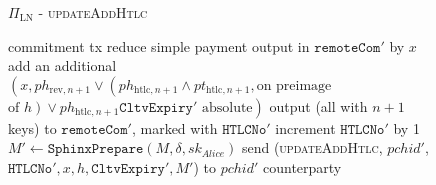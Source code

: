 \begin{figure}[H]
\begin{protocolbox}{$\Pi_{\mathrm{LN}}$ - \textsc{updateAddHtlc}}
\begin{algorithmic}[1]
            commitment tx
            \State reduce simple payment output in $\mathtt{remoteCom}'$ by $x$
            \State add an additional $\left(x, ph_{\mathrm{rev}, n+1} \vee
            \left(ph_{\mathrm{htlc}, n+1} \wedge pt_{\mathrm{htlc}, n+1}, \text{
            on preimage}\right.\right.$ $\left.\left.\text{of } h\right) \vee
            ph_{\mathrm{htlc}, n+1}\mathtt{CltvExpiry}' \text{ absolute}\right)$
            output (all with $n+1$ keys) to $\mathtt{remoteCom}'$, marked with
            $\texttt{HTLCNo}'$
            \State increment $\texttt{HTLCNo}'$ by 1
            \State $M' \gets \mathtt{SphinxPrepare}\left(M, \delta,
            sk_{\mathit{Alice}}\right)$
            \State send (\textsc{updateAddHtlc}, $\mathit{pchid}'$,
            $\mathtt{HTLCNo}', x, h, \mathtt{CltvExpiry}', M'$) to
            $\mathit{pchid}'$ counterparty
          \EndIf
        \EndIndent
      \end{algorithmic}
    \end{protocolbox}
    \caption{}
    \label{alg:protocol:pay:updateAddHtlc}
  \end{figure}

